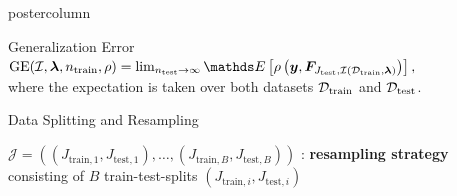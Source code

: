 \documentclass{beamer}
\begin{document}
\begin{frame}[fragile]{}
\begin{columns}
\begin{column}{.31\textwidth}
\begin{beamercolorbox}[center]{postercolumn}
\begin{minipage}{.98\textwidth}
{\begin{myblock}{Generalization Error}
 $\mathrm{GE}(\ind, \bm{\lambda}, n_{\mathrm{train}}, \rho) = \lim_{n_{\mathrm{test}}\rightarrow\infty} \E \left[ \rho\left(\boldsymbol{y}, \boldsymbol{F}_{J_{\mathrm{test}},\ind(\mathcal{D}_{\mathrm{train}}, \bm{\lambda})}\right)\right],$ \\
 
where the expectation is taken over both datasets $\mathcal{D}_{\text{train}}$ and $\mathcal{D}_{\text{test}}$.
\end{myblock}
\begin{myblock}{Data Splitting and Resampling}

$\mathcal{J} = \left((J_{\mathrm{train},1}, J_{\mathrm{test},1}),\dots,
(J_{\mathrm{train},B}, J_{\mathrm{test},B})\right)$ : \textbf{resampling strategy} consisting of $B$ train-test-splits $(J_{\mathrm{train},i}, J_{\mathrm{test},i})$


\end{myblock}}
\end{minipage}
\end{beamercolorbox}
\end{column}
\end{columns}
\end{frame}
\end{document}
